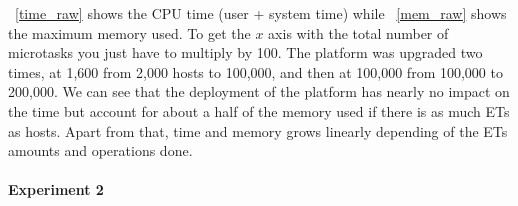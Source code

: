 \documentclass[a4paper, onecolumn, 11pt]{article}
\begin{document}
    \figurename~\ref{time_raw} shows the CPU time (user + system time) while
    \figurename~\ref{mem_raw} shows the maximum memory used. To get the $x$ axis
    with the total number of microtasks you just have to multiply by 100. The
    platform was upgraded two times, at 1,600 from 2,000 hosts to 100,000, and
    then at 100,000 from 100,000 to 200,000. We can see that the deployment of
    the platform has nearly no impact on the time but account for about a half
    of the memory used if there is as much ETs as hosts. Apart from that, time
    and memory grows linearly depending of the ETs amounts and operations done.
    
    \paragraph{Experiment 2}
\end{document}
